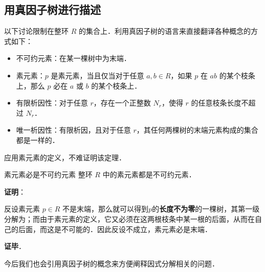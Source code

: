 

\subsection{用真因子树进行描述}

以下讨论限制在整环 $R$ 的集合上．利用真因子树的语言来直接翻译各种概念的方式如下：

\begin{definition}{}\label{FctTre_def1}
\begin{itemize}
\item 不可约元素：在某一棵树中为末端．
\item 素元素：$p$ 是素元素，当且仅当对于任意 $a, b\in R$，如果 $p$ 在 $ab$ 的某个枝条上，那么 $p$ 必在 $a$ 或 $b$ 的某个枝条上．
\item 有限析因性：对于任意 $r$，存在一个正整数 $N_r$，使得 $r$ 的任意枝条长度不超过 $N_r$．
\item 唯一析因性：有限析因，且对于任意 $r$，其任何两棵树的末端元素构成的集合都是一样的．
\end{itemize}
\end{definition}

应用素元素的定义，不难证明该定理．


\begin{theorem}{素元素必是不可约元素}
整环 $R$ 中的素元素都是不可约元素．
\end{theorem}

\textbf{证明}：

反设素元素 $p\in R$ 不是末端，那么就可以得到$p$的\textbf{长度不为零}的一棵树，其第一级分解为$$；而由于素元素的定义，它又必须在这两根枝条中某一根的后面，从而在自己的后面，而这是不可能的．因此反设不成立，素元素必是末端．

\textbf{证毕}．

今后我们也会引用真因子树的概念来方便阐释因式分解相关的问题．

